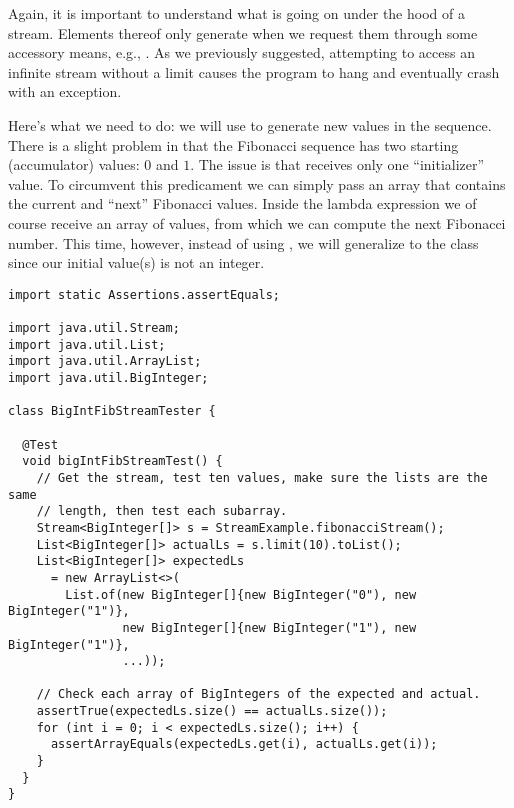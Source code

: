 Again, it is important to understand what is going on under the hood of a stream. Elements thereof only generate when we request them through some accessory means, e.g., . As we previously suggested, attempting to access an infinite stream without a limit causes the program to hang and eventually crash with an  exception.


Here's what we need to do: we will use  to generate new values in the sequence. There is a slight problem in that the Fibonacci sequence has two starting (accumulator) values: $0$ and $1$. The issue is that  receives only one ``initializer'' value. To circumvent this predicament we can simply pass an array that contains the current and ``next'' Fibonacci values. Inside the lambda expression we of course receive an array of values, from which we can compute the next Fibonacci number. This time, however, instead of using , we will generalize to the  class since our initial value(s) is not an integer.

\begin{cl}[]{}
\begin{lstlisting}[language=MyJava]
import static Assertions.assertEquals;

import java.util.Stream;
import java.util.List;
import java.util.ArrayList;
import java.util.BigInteger;

class BigIntFibStreamTester {

  @Test
  void bigIntFibStreamTest() {
    // Get the stream, test ten values, make sure the lists are the same
    // length, then test each subarray.
    Stream<BigInteger[]> s = StreamExample.fibonacciStream();
    List<BigInteger[]> actualLs = s.limit(10).toList();
    List<BigInteger[]> expectedLs 
      = new ArrayList<>(
        List.of(new BigInteger[]{new BigInteger("0"), new BigInteger("1")},
                new BigInteger[]{new BigInteger("1"), new BigInteger("1")},
                ...));

    // Check each array of BigIntegers of the expected and actual.
    assertTrue(expectedLs.size() == actualLs.size());
    for (int i = 0; i < expectedLs.size(); i++) {
      assertArrayEquals(expectedLs.get(i), actualLs.get(i));
    }
  }
}
\end{lstlisting}
\end{cl}

